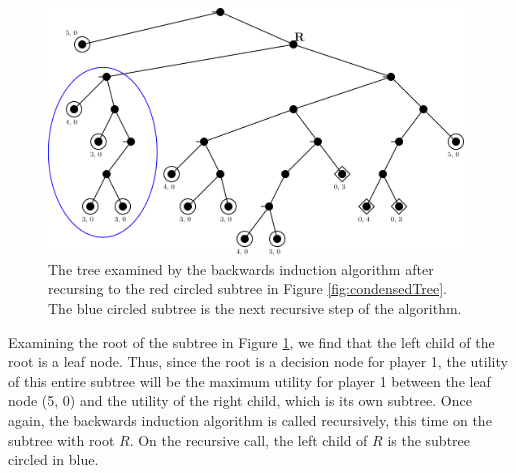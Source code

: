\begin{figure}[H]
  \centering
  \includegraphics[width=11cm]{figures/Backwards1.png}
  \caption{The tree examined by the backwards induction algorithm after recursing to the red circled subtree in Figure \ref{fig:condensedTree}. The blue circled subtree is the next recursive step of the algorithm.}
  \label{fig:backwards1}
\end{figure}
Examining the root of the subtree in Figure \ref{fig:backwards1}, we find that the left child of the root is a leaf node. Thus, since the root is a decision node for player 1, the utility of this entire subtree will be the maximum utility for player 1 between the leaf node (5, 0) and the utility of the right child, which is its own subtree. Once again, the backwards induction algorithm is called recursively, this time on the subtree with root $R$. On the recursive call, the left child of $R$ is the subtree circled in blue.\\

